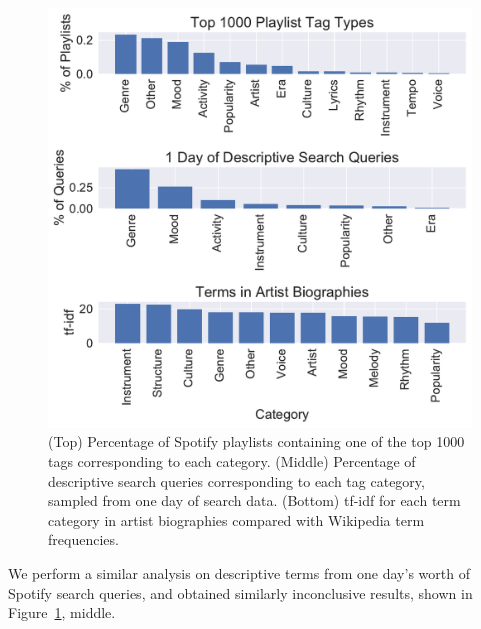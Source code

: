 \documentclass{article}
\begin{document}
\begin{figure}
\begin{center}
\includegraphics[width=\columnwidth]{figs/AllFreqs.pdf}
\end{center}
\caption{(Top) Percentage of Spotify playlists containing one of the top 1000 tags corresponding to each category. (Middle) Percentage of descriptive search queries corresponding to each tag category, sampled from one day of search data. (Bottom) tf-idf for each term category in artist biographies compared with Wikipedia term frequencies.}\label{fig:playlist-tags}
\end{figure}


We perform a similar analysis on descriptive terms from one day's worth of Spotify search queries, and obtained similarly inconclusive results, shown in Figure~\ref{fig:playlist-tags}, middle.
\end{document}
